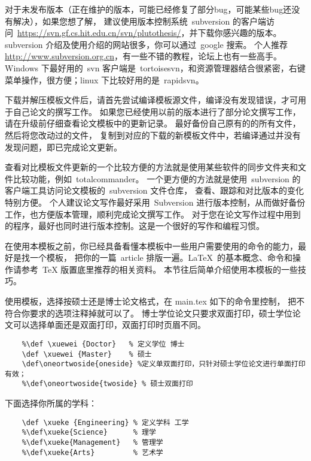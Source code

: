 对于未发布版本（正在维护的版本，可能已经修复了部分bug，可能某些bug还没有解决），如果您想了解，
建议使用版本控制系统~subversion 的客户端访问~\url{https://svn.gf.cs.hit.edu.cn/svn/plutothesis/}，并下载你感兴趣的版本。
subversion 介绍及使用介绍的网站很多，你可以通过~google 搜索。
个人推荐~ \url{http://www.subversion.org.cn}，有一些不错的教程，论坛上也有一些高手。
Windows 下最好用的~svn 客户端是~tortoisesvn，和资源管理器结合很紧密，右键菜单操作，很方便；linux 下比较好用的是~rapidsvn。

下载并解压模板文件后，请首先尝试编译模板源文件，编译没有发现错误，才可用于自己论文的撰写工作。
如果您已经使用以前的版本进行了部分论文撰写工作，请在升级前仔细查看论文模板中的更新记录。
最好备份自己原有的的所有文件，然后将您改动过的文件，
复制到对应的下载的新模板文件中，若编译通过并没有发现问题，即已完成论文更新。

查看对比模板文件更新的一个比较方便的方法就是使用某些软件的同步文件夹和文件比较功能，例如~totalcommander。
一个更方便的方法就是使用~subversion 的客户端工具访问论文模板的~subversion 文件仓库，
查看、跟踪和对比版本的变化特别方便。
个人建议论文写作最好采用~Subversion 进行版本控制，从而做好备份工作，也方便版本管理，顺利完成论文撰写工作。
对于您在论文写作过程中用到的程序，最好也同时进行版本控制。这是一个很好的写作和编程习惯。

\label{Tricks:Introduction}
在使用本模板之前，你已经具备看懂本模板中一些用户需要使用的命令的能力，最好是找一个模板，
把你的一篇~article 排版一遍。\LaTeX{}~的基本概念、命令和操作请参考~TeX 版置底里推荐的相关资料。
本节往后简单介绍使用本模板的一些技巧。


使用模板，选择按硕士还是博士论文格式，在 main.tex 如下的命令里控制， 把不符合你要求的选项注释掉就可以了。
博士学位论文只要求双面打印，硕士学位论文可以选择单面还是双面打印，双面打印时页眉不同。\vspace{-5pt}
\begin{verbatim}
    %\def \xuewei {Doctor}   % 定义学位 博士
    \def \xuewei {Master}    % 硕士
    \def\oneortwoside{oneside} %定义单双面打印，只针对硕士学位论文进行单面打印有效；
    %\def\oneortwoside{twoside} % 硕士双面打印
\end{verbatim}

下面选择你所属的学科：\vspace{-5pt}
\begin{verbatim}
    \def \xueke {Engineering} % 定义学科 工学
    %\def\xueke{Science}      % 理学
    %\def\xueke{Management}   % 管理学
    %\def\xueke{Arts}         % 艺术学
\end{verbatim}

